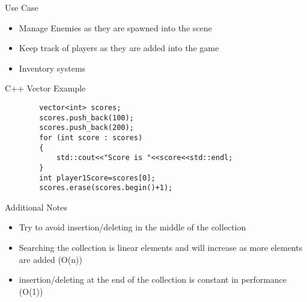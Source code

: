 \begin{frame}{Use Case}
	\begin{itemize}
		\pause \item Manage Enemies as they are spawned into the scene
		\pause \item Keep track of players as they are added into the game
		\pause \item Inventory systems 
	\end{itemize}
\end{frame}


\begin{frame}[fragile]{C++ Vector
	Example}
	\begin{lstlisting}
		vector<int> scores;
		scores.push_back(100);
		scores.push_back(200);
		for (int score : scores)
		{
			std::cout<<"Score is "<<score<<std::endl;
		}
		int player1Score=scores[0];
		scores.erase(scores.begin()+1);
	\end{lstlisting}
\end{frame}

\begin{frame}{Additional Notes}
	\begin{itemize}
		\pause \item Try to avoid insertion/deleting in the middle of the collection
		\pause \item Searching the collection is linear elements and will increase as more elements are added (O(n))
		\pause \item insertion/deleting at the end of the collection is constant in performance (O(1)) 
	\end{itemize}
\end{frame}
